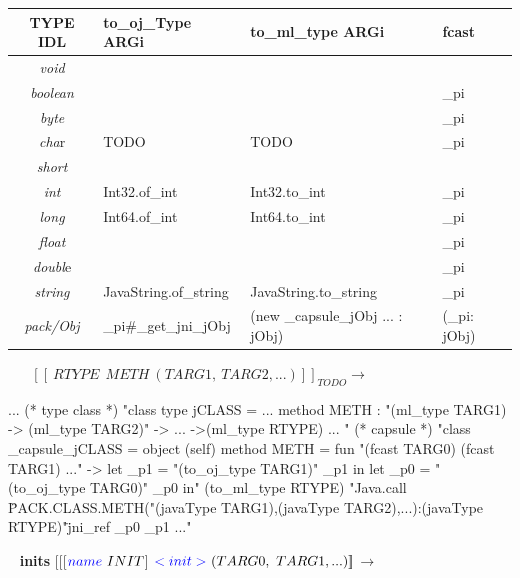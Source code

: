 \documentclass[a4paper, 11pt, notitlepage]{article}
\begin{document}
\begin{tabular}{|c|l|l|l|}
  \hline

  TYPE IDL & to\_oj\_Type ARGi & to\_ml\_type ARGi & fcast\\

  \hline
  \emph{void} &   &  & \\

  \emph{boolean} &  &  &\_pi \\

 \emph{byte} & &  &\_pi  \\

 \emph{cha}r & TODO  & TODO & \_pi \\

  \emph{short} & &  & \\

 \emph{int} & Int32.of\_int\ & Int32.to\_int & \_pi\\

 \emph{long} & Int64.of\_int & Int64.to\_int & \_pi\\

 \emph{float} & & &\_pi \\

  \emph{doubl}e & & & \_pi\\

 \emph{string} & JavaString.of\_string & JavaString.to\_string & \_pi\\

 \emph{pack/Obj} & \_pi\#\_get\_jni\_jObj & (new \_capsule\_jObj ... : jObj) & (\_pi: jObj)\\

  \hline
\end{tabular}
\ 
\newline
\ 
\newline
\noindent
$[\![\ RTYPE\ \ METH\ (TARG1,\ TARG2, ...)]\!]_{ TODO }$$\longrightarrow$

\begin{OCaml}
...
(* type class *)
"class type jCLASS =
   ...
   method METH : "(ml_type TARG1) -> (ml_type TARG2)" -> ... ->(ml_type RTYPE)
   ... "
(* capsule *)
"class _capsule_jCLASS =
   object (self)      
      method METH =
         fun "(fcast TARG0) (fcast TARG1) ..." ->
           let _p1 = "(to_oj_type TARG1)" _p1 in
           let _p0 = "(to_oj_type TARG0)" _p0
           in"
             (to_ml_type RTYPE)
             "Java.call \"PACK.CLASS.METH("(javaType TARG1),(javaType TARG2),...):(javaType RTYPE)"\" jni_ref _p0 _p1 ..."

\end{OCaml}
\ 
\newline
\noindent
\textbf{ inits }
\newline
\noindent
$[\![$[$ {\color{blue}name}\ INIT $]$\ {\color{blue}
      <init>}\ (TARG0,\ TARG1, ...)]\!]_{}$$\longrightarrow$
% 
\end{document}
